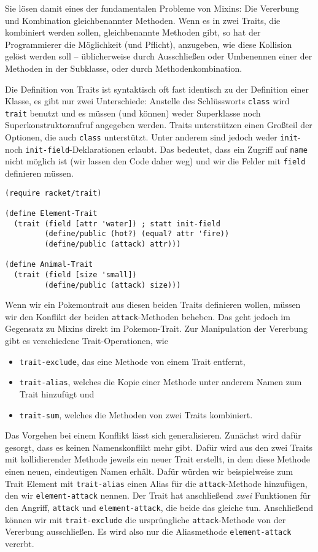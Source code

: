 Sie lösen damit eines der fundamentalen Probleme von Mixins: Die Vererbung und Kombination gleichbenannter Methoden. Wenn es in zwei Traits, die kombiniert werden sollen, gleichbenannte Methoden gibt, so hat der Programmierer die Möglichkeit (und Pflicht), anzugeben, wie diese Kollision gelöst werden soll -- üblicherweise durch Ausschließen oder Umbenennen einer der Methoden in der Subklasse, oder durch Methodenkombination.

Die Definition von Traits ist syntaktisch oft fast identisch zu der Definition einer Klasse, es gibt nur zwei Unterschiede: Anstelle des Schlüssworts \texttt{class} wird \texttt{trait} benutzt und es müssen (und können) weder Superklasse noch Superkonstruktoraufruf angegeben werden. Traits unterstützen einen Großteil der Optionen, die auch \texttt{class} unterstützt. Unter anderem sind jedoch weder \texttt{init}- noch \texttt{init-field}-Deklarationen erlaubt. Das bedeutet, dass ein Zugriff auf \texttt{name} nicht möglich ist (wir lassen den Code daher weg) und wir die Felder mit \texttt{field} definieren müssen.

\begin{lstlisting}
(require racket/trait)

(define Element-Trait
  (trait (field [attr 'water]) ; statt init-field
         (define/public (hot?) (equal? attr 'fire))
         (define/public (attack) attr)))

(define Animal-Trait
  (trait (field [size 'small])
         (define/public (attack) size)))
\end{lstlisting}

Wenn wir ein Pokemontrait aus diesen beiden Traits definieren wollen, müssen wir den Konflikt der beiden \texttt{attack}-Methoden beheben. Das geht jedoch im Gegensatz zu Mixins direkt im Pokemon-Trait. Zur Manipulation der Vererbung gibt es verschiedene Trait-Operationen, wie
\begin{itemize}
 \item \texttt{trait-exclude}, das eine Methode von einem Trait entfernt,
 \item \texttt{trait-alias}, welches die Kopie einer Methode unter anderem Namen zum Trait hinzufügt und
 \item \texttt{trait-sum}, welches die Methoden von zwei Traits kombiniert.
\end{itemize}

Das Vorgehen bei einem Konflikt lässt sich generalisieren. Zunächst wird dafür gesorgt, dass es keinen Namenskonflikt mehr gibt. Dafür wird aus den zwei Traits mit kollidierender Methode jeweils ein neuer Trait erstellt, in dem diese Methode einen neuen, eindeutigen Namen erhält. Dafür würden wir beispielweise zum Trait Element mit \texttt{trait-alias} einen Alias für die \texttt{attack}-Methode hinzufügen, den wir \texttt{element-attack} nennen. Der Trait hat anschließend \emph{zwei} Funktionen für den Angriff, \texttt{attack} und \texttt{element-attack}, die beide das gleiche tun. Anschließend können wir mit \texttt{trait-exclude} die ursprüngliche \texttt{attack}-Methode von der Vererbung ausschließen. Es wird also nur die Aliasmethode \texttt{element-attack} vererbt.

